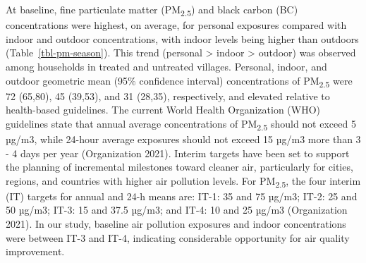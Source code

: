 \documentclass[
  letterpaper,
  DIV=11,
  numbers=noendperiod]{scrartcl}
\begin{document}
At baseline, fine particulate matter (PM\textsubscript{2.5}) and black
carbon (BC) concentrations were highest, on average, for personal
exposures compared with indoor and outdoor concentrations, with indoor
levels being higher than outdoors (Table~\ref{tbl-pm-season}). This
trend (personal \textgreater{} indoor \textgreater{} outdoor) was
observed among households in treated and untreated villages. Personal,
indoor, and outdoor geometric mean (95\% confidence interval)
concentrations of PM\textsubscript{2.5} were 72 (65,80), 45 (39,53), and
31 (28,35), respectively, and elevated relative to health-based
guidelines. The current World Health Organization (WHO) guidelines state
that annual average concentrations of PM\textsubscript{2.5} should not
exceed 5 µg/m3, while 24-hour average exposures should not exceed 15
µg/m3 more than 3 - 4 days per year (Organization 2021). Interim targets
have been set to support the planning of incremental milestones toward
cleaner air, particularly for cities, regions, and countries with higher
air pollution levels. For PM\textsubscript{2.5}, the four interim (IT)
targets for annual and 24-h means are: IT-1: 35 and 75 µg/m3; IT-2: 25
and 50 µg/m3; IT-3: 15 and 37.5 µg/m3; and IT-4: 10 and 25 µg/m3
(Organization 2021). In our study, baseline air pollution exposures and
indoor concentrations were between IT-3 and IT-4, indicating
considerable opportunity for air quality improvement.
\end{document}
